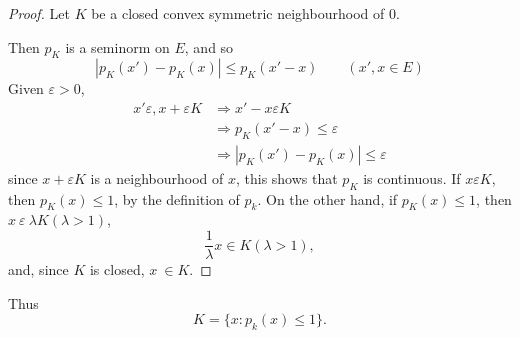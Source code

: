 \begin{proof}
  Let $K$ be a closed convex symmetric neighbourhood of 0.

Then $p_K$ is a seminorm on $E$, and so 
$$
|p_K (x')-p_K (x)| \leq p_K (x'-x) \qquad (x', x \in E)
$$
Given $\varepsilon > 0$,
\begin{align*}
  x' \varepsilon,  x + \varepsilon K & \Rightarrow x' -x  \varepsilon K\\
  & \Rightarrow p_K (x'-x) \leq \varepsilon\\
  & \Rightarrow |p_K (x')-p_K(x) | \leq \varepsilon
\end{align*}
since $x + \varepsilon K$ is a neighbourhood of $x$, this shows that $p_K$ is
continuous. If $x \varepsilon K$, then $p_K (x) \leq 1$, by the
definition of $p_k$. On the other hand, if $p_K (x) \leq 1$, then $x
~\varepsilon ~\lambda K (\lambda > 1)$, 
$$
\frac{1}{\lambda}x \in K (\lambda > 1),
$$
and, since $K$ is closed, $x ~ \in K$.
\end{proof}

Thus\pageoriginale
$$
K = \{ x : p_k (x) \leq 1\}.
$$

